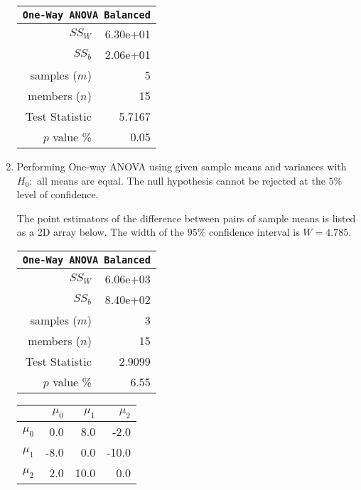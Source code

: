\begin{enumerate}
	\begin{table}[H]
		\centering
		\begin{tabular}{@{}rr@{}}
			\toprule
			\multicolumn{2}{c}{\texttt{One-Way ANOVA Balanced}} \\
			\midrule
			$SS_W$         &               6.30e+01 \\
			$SS_b$         &               2.06e+01 \\
			samples ($m$)  &                      5 \\
			members ($n$)  &                     15 \\
			Test Statistic &                 5.7167 \\
			$p$ value \%   &                   0.05 \\
			\bottomrule
		\end{tabular}
		
		\bigskip
	\end{table}

	\item Performing One-way ANOVA using given sample means and variances with $ H_0 : $ all means are equal. The null hypothesis cannot be rejected at the $ 5\% $ level of confidence.
	
	The point estimators of the difference between pairs of sample means is listed as a 2D array below. The width of the $ 95\% $ confidence interval is $ W = 4.785 $.
	
	\begin{table}[H]
		\centering
		\begin{minipage}{0.4\textwidth}
			\centering
			\begin{tabular}{@{}rr@{}}
				\toprule
				\multicolumn{2}{c}{\texttt{One-Way ANOVA Balanced}} \\
				\midrule
				$SS_W$         &               6.06e+03 \\
				$SS_b$         &               8.40e+02 \\
				samples ($m$)  &                      3 \\
				members ($n$)  &                     15 \\
				Test Statistic &                 2.9099 \\
				$p$ value \%   &                   6.55 \\
				\bottomrule
			\end{tabular}
		\end{minipage}
		\begin{minipage}{0.4\textwidth}
			\centering
			\begin{tabular}{lrrr}
				\toprule
				{} &  $\mu_0$ &  $\mu_1$ &  $\mu_2$ \\
				\midrule
				$\mu_0$ &      0.0 &      8.0 &     -2.0 \\
				$\mu_1$ &     -8.0 &      0.0 &    -10.0 \\
				$\mu_2$ &      2.0 &     10.0 &      0.0 \\
				\bottomrule
			\end{tabular}
		\end{minipage}
	\end{table}
	\bigskip
	

\end{enumerate}
